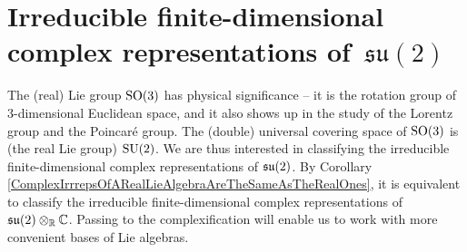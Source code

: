 

\section{Irreducible finite-dimensional complex representations of \,$\mathfrak{su}(2)$}
\setcounter{theorem}{0}
\setcounter{equation}{0}


\renewcommand{\theenumi}{\roman{enumi}}
\renewcommand{\labelenumi}{\textnormal{(\theenumi)}$\;\;$}


\vskip 0.3cm
\begin{remark}
\mbox{}
\vskip 0.1cm
\noindent
The (real) Lie group $\textnormal{SO}(3)$ has physical significance --
it is the rotation group of $3$-dimensional Euclidean space, and
it also shows up in the study of the Lorentz group and the Poincaré group.
The (double) universal covering space of $\textnormal{SO}(3)$ is (the real Lie group) $\textnormal{SU}(2)$.
We are thus interested in classifying the irreducible finite-dimensional complex representations of $\mathfrak{su}(2)$.
By Corollary \ref{ComplexIrrrepsOfARealLieAlgebraAreTheSameAsTheRealOnes},
it is equivalent to classify the irreducible finite-dimensional complex representations of $\mathfrak{su}(2) \otimes_{\mathbb{R}} \mathbb{C}$.
Passing to the complexification will enable us to work with more convenient bases of Lie algebras.
\end{remark}


